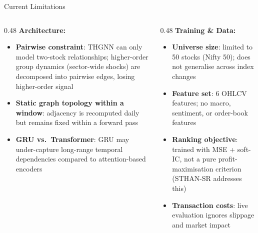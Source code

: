 \documentclass[aspectratio=169, 10pt]{beamer}
\begin{document}
\begin{frame}{Current Limitations}
  \begin{columns}[T]
    \begin{column}{0.48\textwidth}
      \textbf{Architecture:}
      \begin{itemize}
        \item \textbf{Pairwise constraint}: THGNN can only model two-stock
              relationships; higher-order group dynamics (sector-wide shocks)
              are decomposed into pairwise edges, losing higher-order signal
        \item \textbf{Static graph topology within a window}: adjacency is
              recomputed daily but remains fixed within a forward pass
        \item \textbf{GRU vs.\ Transformer}: GRU may under-capture long-range
              temporal dependencies compared to attention-based encoders
      \end{itemize}
    \end{column}
    \begin{column}{0.48\textwidth}
      \textbf{Training \& Data:}
      \begin{itemize}
        \item \textbf{Universe size}: limited to 50 stocks (Nifty 50); does
              not generalise across index changes
        \item \textbf{Feature set}: 6 OHLCV features; no macro, sentiment, or
              order-book features
        \item \textbf{Ranking objective}: trained with MSE + soft-IC, not a
              pure profit-maximisation criterion (STHAN-SR addresses this)
        \item \textbf{Transaction costs}: live evaluation ignores slippage and
              market impact
      \end{itemize}
    \end{column}
  \end{columns}
\end{frame}
\end{document}
